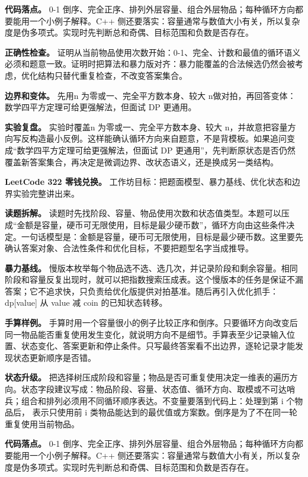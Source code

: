 \textbf{代码落点。} 0-1 倒序、完全正序、排列外层容量、组合外层物品；每种循环方向都要能用一个小例子解释。C++ 侧还要落实：容量通常与数值大小有关，所以复杂度是伪多项式。实现时先判断总和奇偶、目标范围和负数是否存在。

\textbf{正确性检查。} 证明从当前物品使用次数开始：0-1、完全、计数和最值的循环语义必须和题意一致。证明时把算法和暴力版对齐：暴力能覆盖的合法候选仍然会被考虑，优化结构只替代重复检查，不改变答案集合。

\textbf{边界和变体。} 先用n 为零或一、完全平方数本身、较大 n做对拍，再回答变体：数学四平方定理可给更强解法，但面试 DP 更通用。

\textbf{实验复盘。} 实验时覆盖n 为零或一、完全平方数本身、较大 n，并故意把容量方向写反构造最小反例。这样能确认循环方向来自题意，不是背模板。如果追问变成“数学四平方定理可给更强解法，但面试 DP 更通用”，先判断原状态是否仍然覆盖新答案集合，再决定是微调边界、改状态语义，还是换成另一类结构。

\noindent\textbf{LeetCode 322 零钱兑换。} 工作坊目标：把题面模型、暴力基线、优化状态和边界实验完整讲出来。

\textbf{读题拆解。} 读题时先找阶段、容量、物品使用次数和状态值类型。本题可以压成“金额是容量，硬币可无限使用，目标是最少硬币数”，循环方向由这些条件决定。一句话模型是：金额是容量，硬币可无限使用，目标是最少硬币数。这里要先确认答案对象、合法性条件和优化目标，不要把题型名字当成推导。

\textbf{暴力基线。} 慢版本枚举每个物品选不选、选几次，并记录阶段和剩余容量。相同阶段和容量反复出现时，就可以把指数搜索压成表。这个慢版本的任务是保证不漏答案；它不追求快，只负责给优化版提供对拍基准。随后再引入优化抓手：dp[value] 从 value 减 coin 的已知状态转移。

\textbf{手算样例。} 手算时用一个容量很小的例子比较正序和倒序。只要循环方向改变后同一物品能否重复使用发生变化，就说明方向不是细节。手算表至少记录输入位置、状态变化、答案更新和停止条件。只写最终答案看不出边界，逐轮记录才能发现状态更新顺序是否错。

\textbf{状态升级。} 把选择树压成阶段和容量；物品是否可重复使用决定一维表的遍历方向。状态字段建议写成：物品阶段、容量、状态值、循环方向、取模或不可达哨兵；组合和排列必须用不同循环顺序表达。不变量要落到代码上：处理到第 i 个物品后， 表示只使用前 i 类物品能达到的最优值或方案数。倒序是为了不在同一轮重复使用当前物品。

\textbf{代码落点。} 0-1 倒序、完全正序、排列外层容量、组合外层物品；每种循环方向都要能用一个小例子解释。C++ 侧还要落实：容量通常与数值大小有关，所以复杂度是伪多项式。实现时先判断总和奇偶、目标范围和负数是否存在。

